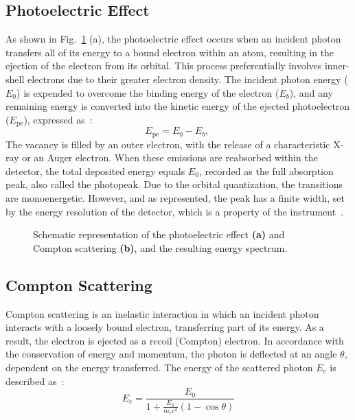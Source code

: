 \subsection{Photoelectric Effect}
As shown in Fig.~\ref{fig:interaction} (a), the photoelectric effect occurs when an incident photon transfers all of its energy to a bound electron within an atom, resulting in the ejection of the electron from its orbital. This process preferentially involves inner-shell electrons due to their greater electron density. The incident photon energy ($E_0$) is expended to overcome the binding energy of the electron ($E_b$), and any remaining energy is converted into the kinetic energy of the ejected photoelectron ($E_{\text{pe}}$), expressed as~\cite{5,6}:
\begin{equation}
E_{\text{pe}} = E_0 - E_b,\ 
\label{eq:photoeletric}
\end{equation}
\indent
The vacancy is filled by an outer electron, with the release of a characteristic X-ray or an Auger electron. When these emissions are reabsorbed within the detector, the total deposited energy equals $E_0$, recorded as the full absorption peak, also called the photopeak. Due to the orbital quantization, the transitions are monoenergetic. However, and as represented, the peak has a finite width, set by the energy resolution of the detector, which is a property of the instrument~\cite{14}.
\begin{figure}[H]
  \centering
  
  \caption[Photon interactions in IR.]{Schematic representation of the photoelectric effect \textbf{(a)} and Compton scattering \textbf{(b)}, and the resulting energy spectrum.}

  \label{fig:interaction}
\end{figure}



\subsection{Compton Scattering}
\label{sec:compton_scattering}
Compton scattering is an inelastic interaction in which an incident photon interacts with a loosely bound electron, transferring part of its energy. As a result, the electron is ejected as a recoil (Compton) electron. In accordance with the conservation of energy and momentum, the photon is deflected at an angle $\theta$, dependent on the energy transferred. The energy of the scattered photon $E_c$ is described as~\cite{6}:
\begin{equation}
E_c = \frac{E_0}{1 + \frac{E_0}{m_e c^2}(1 - \cos\theta)}
\label{eq:compton}
\end{equation}

